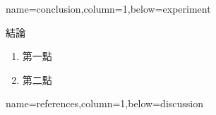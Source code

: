 \documentclass[a0paper,portrait]{baposter}
\begin{document}
\begin{poster}
{name=conclusion,column=1,below=experiment}{

結論

\begin{enumerate}
\item 第一點
\item 第二點
\end{enumerate}
}




{name=references,column=1,below=discussion}{

\smaller %
\renewcommand{\section}[2]{\vskip 0.05em} %
\nocite{*} %


}


\end{poster}
\end{document}
